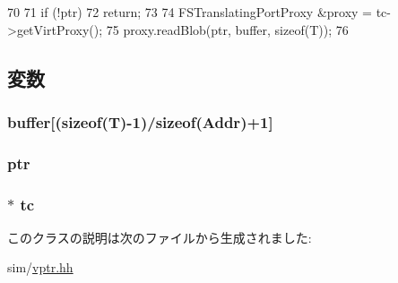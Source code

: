 \begin{DoxyCode}
70     {
71         if (!ptr)
72             return;
73 
74         FSTranslatingPortProxy &proxy = tc->getVirtProxy();
75         proxy.readBlob(ptr, buffer, sizeof(T));
76     }
\end{DoxyCode}


\subsection{変数}
\hypertarget{classVPtr_a79aef1f914ef7a7d47c7cff2c2b6cdf6}{
\subsubsection[{buffer}]{ {\bf buffer}\mbox{[}(sizeof(T)-\/1)/sizeof({\bf Addr})+1\mbox{]}}}
\label{classVPtr_a79aef1f914ef7a7d47c7cff2c2b6cdf6}
\hypertarget{classVPtr_afbbc6404a3002307f96de20d0c5242c9}{
\subsubsection[{ptr}]{ {\bf ptr}}}
\label{classVPtr_afbbc6404a3002307f96de20d0c5242c9}
\hypertarget{classVPtr_a4455a4759e69e5ebe68ae7298cbcc37d}{
\subsubsection[{tc}]{$\ast$ {\bf tc}}}
\label{classVPtr_a4455a4759e69e5ebe68ae7298cbcc37d}


このクラスの説明は次のファイルから生成されました:\begin{DoxyCompactItemize}
\item 
sim/\hyperlink{vptr_8hh}{vptr.hh}\end{DoxyCompactItemize}

